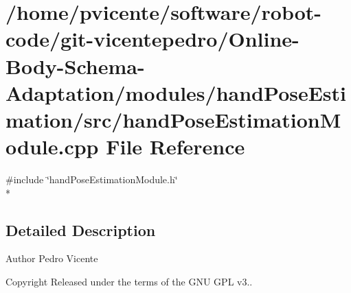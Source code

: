 \section{/home/pvicente/software/robot-\/code/git-\/vicentepedro/\+Online-\/\+Body-\/\+Schema-\/\+Adaptation/modules/hand\+Pose\+Estimation/src/hand\+Pose\+Estimation\+Module.cpp File Reference}
\label{handPoseEstimationModule_8cpp}
{\ttfamily \#include \char`\"{}hand\+Pose\+Estimation\+Module.\+h\char`\"{}}\\*


\subsection{Detailed Description}
\begin{DoxyAuthor}{Author}
Pedro Vicente 
\end{DoxyAuthor}
\begin{DoxyCopyright}{Copyright}
Released under the terms of the G\+NU G\+PL v3.. 
\end{DoxyCopyright}
